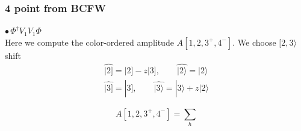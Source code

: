 \documentclass{beamer}
\newcommand{\aket}[1]{|#1\rangle}
\newcommand{\sket}[1]{|#1]}
\begin{document}
\begin{frame}
    \frametitle{4 point from BCFW}
    $\bullet \, \Phi^\dagger V_1V_1\Phi$\\
    Here we compute the color-ordered amplitude $A[1,2,3^+,4^-]$. We choose $[2,3\rangle$ shift
    \begin{gather*}
        \hat{\sket{2}}=\sket{2}-z\sket{3},\qquad \hat{\aket{2}}=\aket{2} \\
        \hat{\sket{3}}=\sket{3},\qquad \hat{\aket{3}}=\aket{3}+z\aket{2}
    \end{gather*}
    \begin{minipage}{0.5\textwidth}
        \begin{equation*}
        A[1,2,3^+,4^-] = \sum_{h}
        \end{equation*}
        \end{minipage}
        \hspace{-3em}
        \begin{minipage}{0.45\textwidth}
        \end{minipage}
\end{frame}
\end{document}
